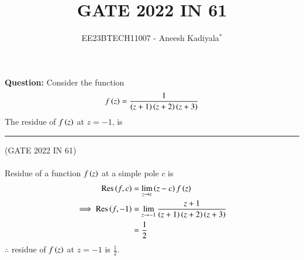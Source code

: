 \documentclass[journal,12pt,twocolumn]{IEEEtran}
\theoremstyle{remark}
\begin{document}

\vspace{3cm}

\title{GATE 2022 IN 61}
\author{EE23BTECH11007 - Aneesh Kadiyala$^{*}$%
}
\maketitle
\newpage
\bigskip

\renewcommand{\thefigure}{\theenumi}
\renewcommand{\thetable}{\theenumi}

\vspace{3cm}
\textbf{Question:} Consider the function
\begin{align*}
f\left(z\right) = \frac{1}{\left(z+1\right)\left(z+2\right)\left(z+3\right)}
\end{align*}
The residue of $f\left(z\right)$ at $z=-1$, is \rule{1cm}{0.15mm}

\hfill(GATE 2022 IN 61)
\\
\solution
\\
Residue of a function $f\left(z\right)$ at a simple pole $c$ is
\begin{align}
\text{Res}\left(f, c\right) &= \lim_{z \to c}\left(z - c\right)f\left(z\right) \\
\implies \text{Res}\left(f,-1\right) &= \lim_{z \to -1}\frac{z + 1}{\left(z+1\right)\left(z+2\right)\left(z+3\right)} \\
&= \frac{1}{2}
\end{align}
$\therefore$ residue of $f\left(z\right)$ at $z = -1$ is $\frac{1}{2}$.
\end{document}
